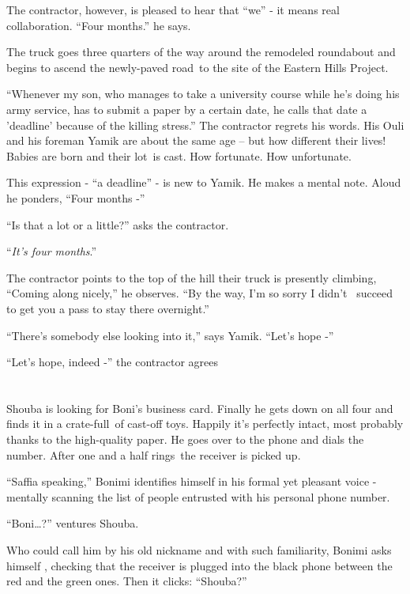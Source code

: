 \documentclass[twoside,11pt]{book}
\begin{document}
The contractor, however, is pleased to hear that ``we'' - it means real collaboration. ``Four
months.'' he says.

The truck goes three quarters of the way around the remodeled roundabout and begins to ascend the newly-paved road~to
the site of the Eastern Hills Project.

``Whenever my son, who manages{ }to take a university course while he's doing his army
service, has to submit a paper by a certain date, he calls that date a 'deadline' because of the killing
stress.'' The contractor regrets his words. His Ouli and his foreman Yamik are about the same age -- but
how different their lives! Babies are born and their lot~is cast. How fortunate. How unfortunate.

This expression - ``a deadline'' - is new to Yamik. He makes a mental note. Aloud he ponders,
``Four months -''

``Is that a lot or a little?'' asks the contractor.

``\textit{It's four months}.''

The contractor points to the top of the hill their truck is presently climbing, ``Coming along nicely,'' he
observes. ``By the way, I'm so sorry I didn't \ succeed to get you a pass to stay there overnight.''

``There's somebody else looking into it,'' says Yamik. ``Let's hope
-''

``Let's hope, indeed -'' the contractor agrees


\bigskip

\chapter{}

Shouba is looking for Boni's business card. Finally he gets down on all four and finds it in a crate-full~of cast-off
toys. Happily it's perfectly intact, most probably thanks to the high-quality paper. He goes over to the phone and
dials the number. After one and a half rings~the receiver is picked up.

``Saffia speaking,'' Bonimi identifies himself in his formal yet pleasant voice - mentally
scanning the list of people entrusted with his personal phone number.

``Boni{\dots}?'' ventures Shouba.

Who could call him by his old nickname and with such familiarity, Bonimi asks himself , checking that the receiver is
plugged into the black phone between the red and the green ones. Then it clicks: ``Shouba?''
\end{document}
